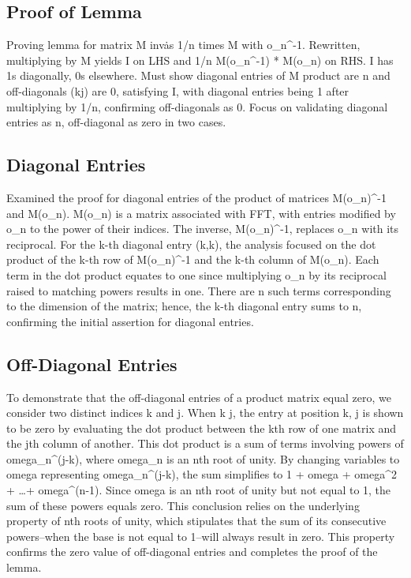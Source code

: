 \subsection*{Proof of Lemma}
Proving lemma for matrix M inv\. as 1/n times M with o\_n\textasciicircum{}-1.
Rewritten, multiplying by M yields I on LHS and 1/n M(o\_n\textasciicircum{}-1) * M(o\_n) on RHS\@.
I has 1s diagonally, 0s elsewhere.
Must show diagonal entries of M product are n and off-diagonals (kj) are 0, satisfying I, with diagonal entries being 1 after multiplying by 1/n, confirming off-diagonals as 0.
Focus on validating diagonal entries as n, off-diagonal as zero in two cases.

\subsection*{Diagonal Entries}
Examined the proof for diagonal entries of the product of matrices M(o\_n)\textasciicircum{}-1 and M(o\_n).
M(o\_n) is a matrix associated with FFT, with entries modified by o\_n to the power of their indices.
The inverse, M(o\_n)\textasciicircum{}-1, replaces o\_n with its reciprocal.
For the k-th diagonal entry (k,k), the analysis focused on the dot product of the k-th row of M(o\_n)\textasciicircum{}-1 and the k-th column of M(o\_n).
Each term in the dot product equates to one since multiplying o\_n by its reciprocal raised to matching powers results in one.
There are n such terms corresponding to the dimension of the matrix; hence, the k-th diagonal entry sums to n, confirming the initial assertion for diagonal entries.

\subsection*{Off-Diagonal Entries}
To demonstrate that the off-diagonal entries of a product matrix equal zero, we consider two distinct indices k and j.
When k  j, the entry at position k, j is shown to be zero by evaluating the dot product between the kth row of one matrix and the jth column of another.
This dot product is a sum of terms involving powers of omega\_n\textasciicircum{}(j-k), where omega\_n is an nth root of unity.
By changing variables to omega representing omega\_n\textasciicircum{}(j-k), the sum simplifies to 1 + omega + omega\textasciicircum{}2 + \ldots + omega\textasciicircum{}(n-1).
Since omega is an nth root of unity but not equal to 1, the sum of these powers equals zero.
This conclusion relies on the underlying property of nth roots of unity, which stipulates that the sum of its consecutive powers--when the base is not equal to 1--will always result in zero.
This property confirms the zero value of off-diagonal entries and completes the proof of the lemma.

